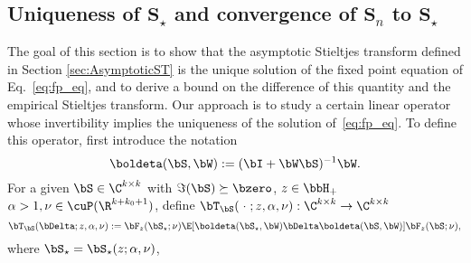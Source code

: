 \subsection{Uniqueness of \texorpdfstring{$\mathbf{S}_\star$}{S*} and convergence of \texorpdfstring{$\mathbf{S}_n$}{Sn} to \texorpdfstring{$\mathbf{S}_\star$}{S*}}
\label{sec:UniquenessSstar}
The goal of this section is to show that the asymptotic Stieltjes transform defined 
in Section \ref{sec:AsymptoticST} is the unique solution of the fixed point equation of Eq.~\eqref{eq:fp_eq}, and to derive a bound on the difference of this quantity and the empirical Stieltjes transform.
Our approach is to study a certain linear operator whose invertibility implies the uniqueness of the solution of~\eqref{eq:fp_eq}.
To define this operator, first introduce the notation
\begin{equation}
        \boldeta(\bS, \bW) := (\bI + \bW\bS)^{-1}\bW.
\end{equation}
For a given $\bS\in\C^{k\times k}$ with $\Im(\bS)\succeq \bzero$, $z\in\bbH_+$ $\alpha >1, \nu\in\cuP(\R^{k+k_0+1})$,
define $\bT_\bS(\;\cdot\;; z,\alpha, \nu):\C^{k\times k}\to \C^{k \times k}$ 
\begin{equation}
\label{eq:def_T}
    \bT_\bS(\bDelta;
    z,\alpha,\nu)
    := \bF_z(\bS_\star;\nu) \E[\boldeta(\bS_\star,\bW) \bDelta  \boldeta(\bS,\bW) ] \bF_z(\bS;\nu),
\end{equation}
where
$\bS_\star = \bS_\star(z; \alpha,\nu)$,
